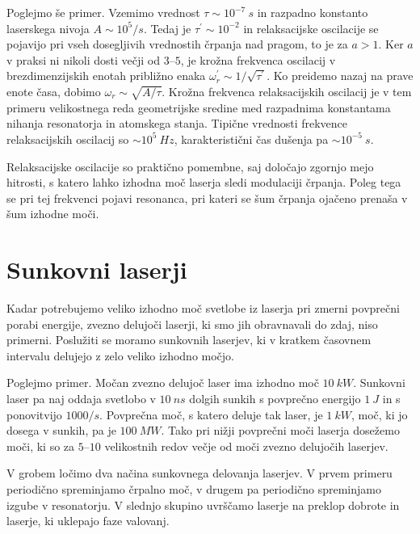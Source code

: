 Poglejmo še primer. Vzemimo vrednost $\tau \sim 10^{-7}~\si{s}$ in razpadno
konstanto laserskega nivoja $A \sim 10^5/\si{s}$. Tedaj je $\tau^{\prime}\sim 10^{-2}$ 
in relaksacijske oscilacije se pojavijo pri vseh dosegljivih vrednostih črpanja 
nad pragom, to je za $a>1$. Ker $a$ v praksi ni nikoli dosti večji od $3$--$5$, 
je krožna frekvenca oscilacij v brezdimenzijskih enotah približno
enaka $\omega^{\prime}_r\sim 1/\sqrt{\tau^{\prime}}$. Ko preidemo
nazaj na prave enote časa, dobimo $\omega_r\sim \sqrt{A/\tau}$. Krožna frekvenca 
relaksacijskih oscilacij je v tem primeru velikostnega reda geometrijske 
sredine med razpadnima konstantama nihanja resonatorja in atomskega stanja. 
Tipične vrednosti frekvence relaksacijskih oscilacij so $\sim 10^5~\si{Hz}$, 
karakteristični čas dušenja pa $\sim 10^{-5}~\si{s}$.
\begin{remark}
Relaksacijske oscilacije so praktično pomembne, saj določajo zgornjo mejo
hitrosti, s katero lahko izhodna moč laserja sledi modulaciji črpanja.
Poleg tega se pri tej frekvenci pojavi resonanca, pri kateri se šum črpanja
ojačeno prenaša v šum izhodne moči. 
\end{remark}

\section{Sunkovni laserji}
Kadar potrebujemo veliko izhodno moč svetlobe iz laserja pri zmerni povprečni porabi 
energije, zvezno delujoči laserji, ki smo jih obravnavali do zdaj, 
niso primerni. Poslužiti se moramo sunkovnih laserjev, 
ki v kratkem časovnem intervalu delujejo z zelo veliko izhodno močjo. 

Poglejmo primer. Močan zvezno delujoč laser ima izhodno moč $10~\si{kW}$.
Sunkovni laser pa naj oddaja svetlobo v $10~\si{ns}$ dolgih sunkih 
s povprečno energijo $1~\si{J}$ in s ponovitvijo $1000/\si{s}$.
Povprečna moč, s katero deluje tak laser, je $1~\si{kW}$, moč, ki jo 
dosega v sunkih, pa je $100~\si{MW}$. Tako pri nižji povprečni moči laserja
dosežemo moči, ki so za $5$--$10$ velikostnih redov večje od moči 
zvezno delujočih laserjev. 

V grobem ločimo dva načina sunkovnega delovanja laserjev. V prvem primeru
periodično spreminjamo črpalno moč, v drugem pa periodično 
spreminjamo izgube v resonatorju. V slednjo skupino uvrščamo laserje na 
preklop dobrote in laserje, ki uklepajo faze valovanj.   

